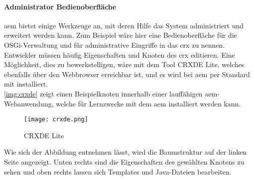 \paragraph{Administrator Bedienoberfläche}
\ac{aem} bietet einige Werkzeuge an, mit deren Hilfe das System administriert und erweitert werden kann. Zum Beispiel wäre hier eine Bedienoberfläche für die OSGi-Verwaltung und für administrative Eingriffe in das \ac{crx} zu nennen.\\
Entwickler müssen häufig Eigenschaften und Knoten des \ac{crx} editieren. Eine Möglichkeit, dies zu bewerkstelligen, wäre mit dem Tool CRXDE Lite, welches ebenfalls über den Webbrowser erreichbar ist, und es wird bei \ac{aem} per Standard mit installiert. \\
\autoref{img:crxde} zeigt einen Beispielknoten innerhalb einer lauffähigen \ac{aem}-Webanwendung, welche für Lernzwecke mit dem \ac{aem} installiert werden kann.

\begin{figure}[H]
	\begin{center}
		\texttt{[image: crxde.png]}
		\caption{CRXDE Lite}
		\label{img:crxde}
	\end{center}
\end{figure}

Wie sich der Abbildung entnehmen lässt, wird die Baumstruktur auf der linken Seite angezeigt. Unten rechts sind die Eigenschaften des gewählten Knotens zu sehen und oben rechts lassen sich Templates und Java-Dateien bearbeiten.